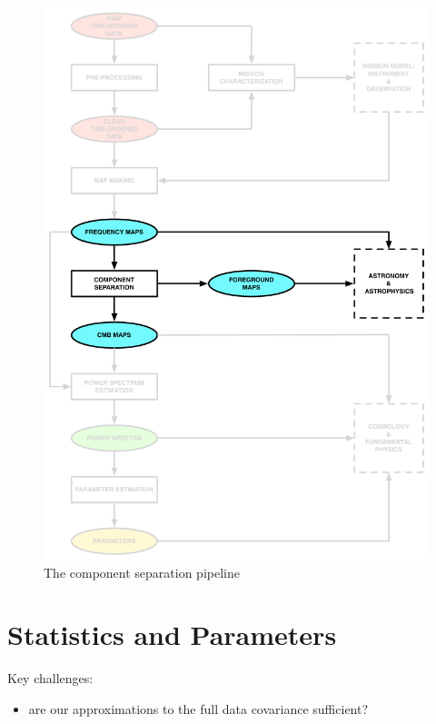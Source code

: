 \begin{figure}[htbp]
\centering
\includegraphics[width=1\textwidth]{cs}
\caption{The component separation pipeline}
\label{default}

\end{figure}

\newpage

\section{Statistics and Parameters}

Key challenges:
\begin{itemize}
\item are our approximations to the full data covariance sufficient?
\end{itemize}

